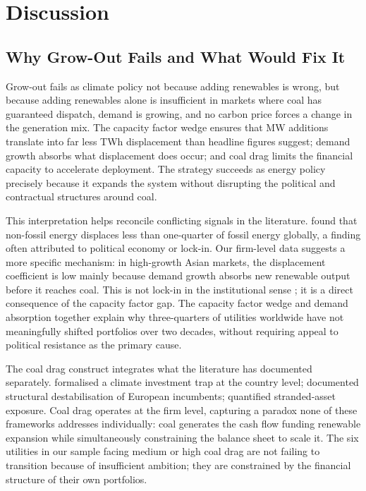\documentclass[review,3p,authoryear]{elsarticle}
\begin{document}
\section{Discussion}
\label{sec:discussion}

\subsection{Why Grow-Out Fails and What Would Fix It}

Grow-out fails as climate policy not because adding renewables is wrong, but because adding renewables alone is insufficient in markets where coal has guaranteed dispatch, demand is growing, and no carbon price forces a change in the generation mix. The capacity factor wedge ensures that MW additions translate into far less TWh displacement than headline figures suggest; demand growth absorbs what displacement does occur; and coal drag limits the financial capacity to accelerate deployment. The strategy succeeds as energy policy precisely because it expands the system without disrupting the political and contractual structures around coal.

This interpretation helps reconcile conflicting signals in the literature. \citet{York2012} found that non-fossil energy displaces less than one-quarter of fossil energy globally, a finding often attributed to political economy or lock-in. Our firm-level data suggests a more specific mechanism: in high-growth Asian markets, the displacement coefficient is low mainly because demand growth absorbs new renewable output before it reaches coal. This is not lock-in in the institutional sense \citep{Alova2020}; it is a direct consequence of the capacity factor gap. The capacity factor wedge and demand absorption together explain why three-quarters of utilities worldwide have not meaningfully shifted portfolios over two decades, without requiring appeal to political resistance as the primary cause.

The coal drag construct integrates what the literature has documented separately. \citet{Ameli2021} formalised a climate investment trap at the country level; \citet{Kungl2018} documented structural destabilisation of European incumbents; \citet{CarbonTracker2021} quantified stranded-asset exposure. Coal drag operates at the firm level, capturing a paradox none of these frameworks addresses individually: coal generates the cash flow funding renewable expansion while simultaneously constraining the balance sheet to scale it. The six utilities in our sample facing medium or high coal drag are not failing to transition because of insufficient ambition; they are constrained by the financial structure of their own portfolios.
\end{document}
